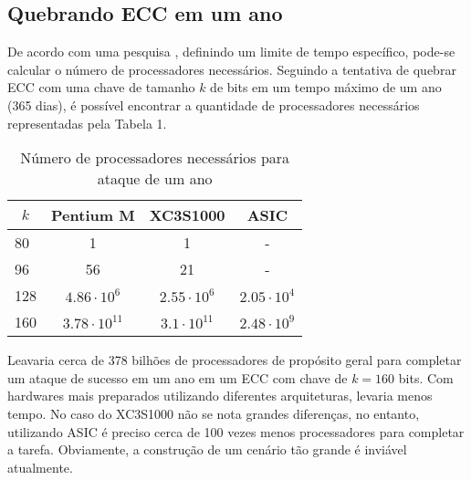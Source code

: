 %
%
\subsection{Quebrando ECC em um ano}
De acordo com uma pesquisa \cite{Pelzl:2006}, definindo um limite de tempo específico, pode-se calcular o número de processadores necessários. Seguindo a tentativa de quebrar ECC com uma chave de tamanho \(k\) de bits em um tempo máximo de um ano (365 dias), é possível encontrar a quantidade de processadores necessários representadas pela Tabela 1.

\begin{table}[]
\centering
\label{table:required_chips}
\begin{tabular}{|l|c|c|c|}
\hline
\multicolumn{1}{|c|}{\(k\)} & \textbf{Pentium M}   & \textbf{XC3S1000}   & \textbf{ASIC}     \\ \hline
80                      & 1                    & 1                   & -                 \\ \hline
96                      & 56                   & 21                  & -                 \\ \hline
128                     & $4.86 \cdot 10^6$    & $2.55 \cdot 10^6$   & $2.05 \cdot 10^4$ \\ \hline
160                     & $3.78 \cdot 10^{11}$ & $3.1 \cdot 10^{11}$ & $2.48 \cdot 10^9$ \\ \hline
\end{tabular}
\caption{Número de processadores necessários para ataque de um ano}
\end{table}

Leavaria cerca de 378 bilhões de processadores de propósito geral para completar um ataque de sucesso em um ano em um ECC com chave de $k = 160$ bits. Com hardwares mais preparados utilizando diferentes arquiteturas, levaria menos tempo. No caso do XC3S1000 não se nota grandes diferenças, no entanto, utilizando ASIC é preciso cerca de 100 vezes menos processadores para completar a tarefa. Obviamente, a construção de um cenário tão grande é inviável atualmente.

